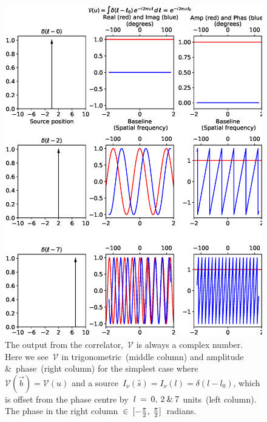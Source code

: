 \documentclass[11pt, a4paper]{article}
\newcommand{\msp}{\mkern \medmuskip}
\begin{document}
\begin{figure}[]
  \centering
    \includegraphics[width=\textwidth ]{03-dirac-vis.eps}
  \caption{The output from the correlator,~$\mathcal{V}$ is always a complex number. Here we see~$\mathcal{V}$ in trigonometric~(middle column) and amplitude \&~phase~(right column) for the simplest case where~$\mathcal{V}(\vec{b}) = \mathcal{V}(u)$ and a source~$I_\nu (\hat{s}) = I_\nu (l) = \delta(l - l_0)$, which is offset from the phase centre by~$l \msp = \msp 0, \msp 2 \msp \mbox{\&} \msp 7$ units~(left column). The phase in the right column~$\in \msp [-\frac{\pi }{2}, \msp \frac{\pi }{2}]$~radians.}
  \label{fig:03-dirac-vis}
\end{figure}
\end{document}
